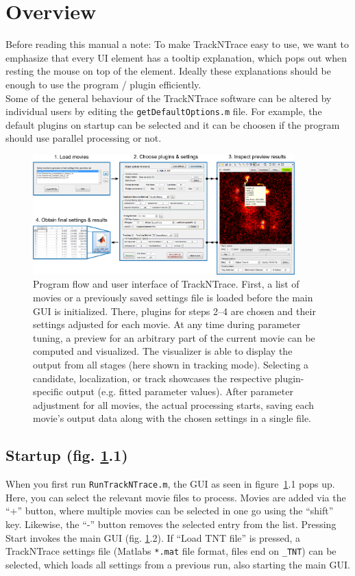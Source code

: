 \documentclass[11pt,onside]{report}
\numberwithin{equation}{chapter}
\begin{document}
\section{Overview}\label{sec:overview}
Before reading this manual a note: To make TrackNTrace easy to use, we want to emphasize that every UI element has a tooltip explanation, which pops out when resting the mouse on top of the element. Ideally these explanations should be enough to use the program / plugin efficiently.\\

Some of the general behaviour of the TrackNTrace software can be altered by individual users by editing the \texttt{getDefaultOptions.m} file. For example, the default plugins on startup can be selected and it can be choosen if the program should use parallel processing or not.

\begin{figure}[!h]
\centering
\includegraphics[width=0.9\textwidth]{./fig0.pdf} 
\caption{Program flow and user interface of TrackNTrace. First, a list of movies or a previously saved settings file is loaded before the main GUI is initialized. There, plugins for steps 2{--}4 are chosen and their settings adjusted for each movie. At any time during parameter tuning, a preview for an arbitrary part of the current movie can be computed and visualized. The visualizer is able to display the output from all stages (here shown in tracking mode). Selecting a candidate, localization, or track showcases the respective plugin-specific output (e.g. fitted parameter values). After parameter adjustment for all movies, the actual processing starts, saving each movie's output data along with the chosen settings in a single file.}
\label{fig:flowdiagram}
\end{figure}

\subsection*{Startup (fig. \ref{fig:flowdiagram}.1)}
When you first run \texttt{RunTrackNTrace.m}, the GUI as seen in figure~\ref{fig:flowdiagram}.1 pops up. Here, you can select the relevant movie files to process. Movies are added via the ``\textsf{+}'' button, where multiple movies can be selected in one go using the ``shift'' key. Likewise, the ``\textsf{-}'' button removes the selected entry from the list. Pressing \textsf{Start} invokes the main GUI (fig. \ref{fig:flowdiagram}.2). If ``\textsf{Load TNT file}'' is pressed, a TrackNTrace settings file (Matlabs \texttt{*.mat} file format, files end on \texttt{\_TNT}) can be selected, which loads all settings from a previous run, also starting the main GUI.
\end{document}
